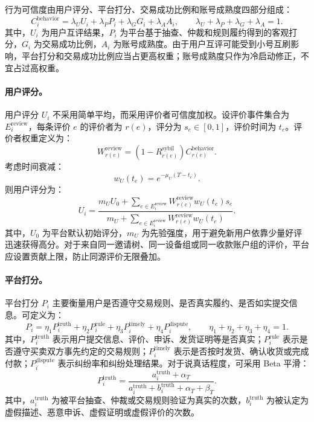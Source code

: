 \documentclass[UTF8,a4paper,12pt]{ctexart}
\begin{document}
行为可信度由用户评分、平台打分、交易成功比例和账号成熟度四部分组成：
\[
    C_i^{\mathrm{behavior}}
    =
    \lambda_U U_i
    +
    \lambda_P P_i
    +
    \lambda_G G_i
    +
    \lambda_A A_i,
    \qquad
    \lambda_U+\lambda_P+\lambda_G+\lambda_A=1.
\]
其中，$U_i$ 为用户互评结果，$P_i$ 为平台基于抽查、仲裁和规则履约得到的客观打分，$G_i$ 为交易成功比例，$A_i$ 为账号成熟度。由于用户互评可能受到小号互刷影响，平台打分和交易成功比例应当占更高权重；账号成熟度只作为冷启动修正，不宜占过高权重。

\paragraph{用户评分。}
用户评分 $U_i$ 不采用简单平均，而采用评价者可信度加权。设评价事件集合为 $E_i^{\mathrm{review}}$，每条评价 $e$ 的评价者为 $r(e)$，评分为 $s_e\in[0,1]$，评价时间为 $t_e$。评价者权重定义为：
\[
    W_{r(e)}^{\mathrm{review}}
    =
    \left(1-R_{r(e)}^{\mathrm{sybil}}\right)
    C_{r(e)}^{\mathrm{behavior}}.
\]
考虑时间衰减：
\[
    w_U(t_e)=e^{-\mu_U(T-t_e)}.
\]
则用户评分为：
\[
    U_i
    =
    \frac{
        m_U U_0+
        \sum_{e\in E_i^{\mathrm{review}}}
        W_{r(e)}^{\mathrm{review}}w_U(t_e)s_e
    }{
        m_U+
        \sum_{e\in E_i^{\mathrm{review}}}
        W_{r(e)}^{\mathrm{review}}w_U(t_e)
    }.
\]
其中，$U_0$ 为平台默认初始评分，$m_U$ 为先验强度，用于避免新用户依靠少量好评迅速获得高分。对于来自同一邀请树、同一设备组或同一收款账户组的评价，平台应设置贡献上限，防止同源评价无限叠加。

\paragraph{平台打分。}
平台打分 $P_i$ 主要衡量用户是否遵守交易规则、是否真实履约、是否如实提交信息。可定义为：
\[
    P_i
    =
    \eta_1P_i^{\mathrm{truth}}
    +
    \eta_2P_i^{\mathrm{rule}}
    +
    \eta_3P_i^{\mathrm{timely}}
    +
    \eta_4P_i^{\mathrm{dispute}},
    \qquad
    \eta_1+\eta_2+\eta_3+\eta_4=1.
\]
其中，$P_i^{\mathrm{truth}}$ 表示用户提交信息、评价、申诉、发货证明等是否真实；$P_i^{\mathrm{rule}}$ 表示是否遵守买卖双方事先约定的交易规则；$P_i^{\mathrm{timely}}$ 表示是否按时发货、确认收货或完成付款；$P_i^{\mathrm{dispute}}$ 表示纠纷率和纠纷处理结果。对于说真话程度，可采用 Beta 平滑：
\[
    P_i^{\mathrm{truth}}
    =
    \frac{
        a_i^{\mathrm{truth}}+\alpha_T
    }{
        a_i^{\mathrm{truth}}+b_i^{\mathrm{truth}}+\alpha_T+\beta_T
    }.
\]
其中，$a_i^{\mathrm{truth}}$ 为被平台抽查、仲裁或交易规则验证为真实的次数，$b_i^{\mathrm{truth}}$ 为被认定为虚假描述、恶意申诉、虚假证明或虚假评价的次数。
\end{document}
